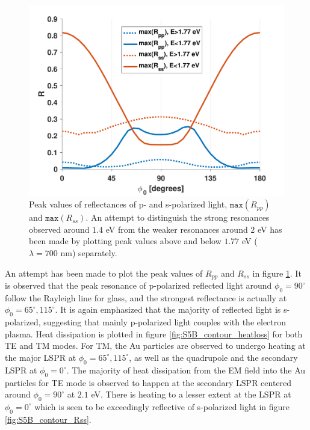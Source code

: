 \begin{figure}
    \centering
    \includegraphics[width=0.6\linewidth]{figures/ch4/S5B/LSPR/RppRss@LSPR_eV.pdf}
    \caption{Peak values of reflectances of p- and s-polarized light, $\texttt{max}(R_{pp})$ and $\texttt{max}(R_{ss})$. An attempt to distinguish the strong resonances observed around $1.4$ eV from the weaker resonances around $2$ eV has been made by plotting peak values above and below $1.77$ eV ($\lambda=700$ nm) separately.}
    \label{fig:S5B_R@LSPR}
\end{figure}
An attempt has been made to plot the peak values of $R_{pp}$ and $R_{ss}$ in figure \ref{fig:S5B_R@LSPR}. It is observed that the peak resonance of p-polarized reflected light around $\phi_0=90^\circ$ follow the Rayleigh line for glass, and the strongest reflectance is actually at $\phi_0=65^\circ, 115^\circ$. It is again emphasized that the majority of reflected light is s-polarized, suggesting that mainly p-polarized light couples with the electron plasma. Heat dissipation is plotted in figure \ref{fig:S5B_contour_heatloss} for both TE and TM modes. For TM, the Au particles are observed to undergo heating at the major LSPR at $\phi_0=65^\circ, 115^\circ$, as well as the quadrupole and the secondary LSPR at $\phi_0=0^\circ$. The majority of heat dissipation from the EM field into the Au particles for TE mode is observed to happen at the secondary LSPR centered around $\phi_0=90^\circ$ at $2.1$ eV. There is heating to a lesser extent at the LSPR at $\phi_0=0^\circ$ which is seen to be exceedingly reflective of s-polarized light in figure \ref{fig:S5B_contour_Rss}. 
